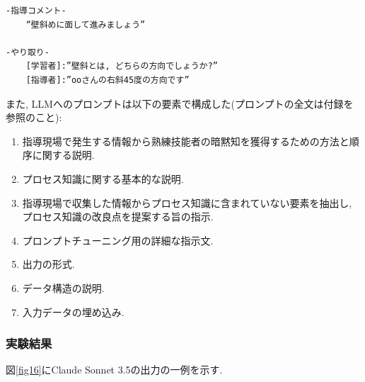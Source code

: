 \label{fig14}




\begin{tcolorbox}[breakable, colback=white, colframe=black]
    \begin{verbatim}
-指導コメント-
    “壁斜めに面して進みましょう”

-やり取り-
    [学習者]:”壁斜とは, どちらの方向でしょうか?”
    [指導者]:”ooさんの右斜45度の方向です”
    \end{verbatim}
\end{tcolorbox}
    
\label{fig15}



また, LLMへのプロンプトは以下の要素で構成した(プロンプトの全文は付録を参照のこと):
\begin{enumerate}
    \item 指導現場で発生する情報から熟練技能者の暗黙知を獲得するための方法と順序に関する説明.
    \item プロセス知識に関する基本的な説明.
    \item 指導現場で収集した情報からプロセス知識に含まれていない要素を抽出し, プロセス知識の改良点を提案する旨の指示.
    \item プロンプトチューニング用の詳細な指示文.
    \item 出力の形式.
    \item データ構造の説明.
    \item 入力データの埋め込み.	
\end{enumerate}




\subsubsection{実験結果}
図\ref{fig16}にClaude Sonnet 3.5の出力の一例を示す.

